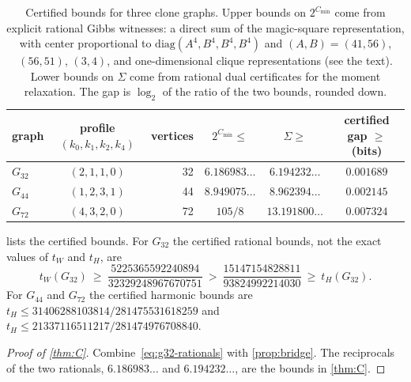 \documentclass[11pt]{article}
\theoremstyle{definition}
\newcommand{\Cmin}{C_{\min}}
\begin{document}
\begin{table}[t]
\centering
\begin{tabular}{@{}lcrccc@{}}
\toprule
graph & profile $(k_0,k_1,k_2,k_4)$ & vertices & $2^{\Cmin}\le$ & $\Sigma\ge$ & certified gap $\ge$ (bits)\\
\midrule
$G_{32}$ & $(2,1,1,0)$ & 32 & $6.186983\ldots$ & $6.194232\ldots$ & $0.001689$\\
$G_{44}$ & $(1,2,3,1)$ & 44 & $8.949075\ldots$ & $8.962394\ldots$ & $0.002145$\\
$G_{72}$ & $(4,3,2,0)$ & 72 & $105/8$          & $13.191800\ldots$ & $0.007324$\\
\bottomrule
\end{tabular}
\caption{Certified bounds for three clone graphs.  Upper bounds on
$2^{\Cmin}$ come from explicit rational Gibbs witnesses: a direct sum of the
magic-square representation, with center proportional to
$\mathrm{diag}(A^4,B^4,B^4,B^4)$ and $(A,B)=(41,56)$, $(56,51)$, $(3,4)$, and
one-dimensional clique representations (see the text).
Lower bounds on $\Sigma$ come from rational dual certificates for the moment
relaxation.  The gap is $\log_2$ of the ratio of the two bounds, rounded
down.}
\label{tab:certified}
\end{table}

 lists the certified bounds.  For $G_{32}$ the certified
rational bounds, not the exact values of $t_W$ and $t_H$, are
\begin{equation}\label{eq:g32-rationals}
 t_W(G_{32})\ \ge\ \frac{5225365592240894}{32329248967670751}
 \ >\ \frac{15147154828811}{93824992214030}\ \ge\ t_H(G_{32}).
\end{equation}
For $G_{44}$ and $G_{72}$ the certified harmonic bounds are
$t_H\le31406288103814/281475531618259$ and
$t_H\le21337116511217/281474976708840$.

\begin{proof}[Proof of \cref{thm:C}]
Combine~\eqref{eq:g32-rationals} with \cref{prop:bridge}.  The reciprocals of
the two rationals, $6.186983\ldots$ and $6.194232\ldots$, are the bounds in
\cref{thm:C}.
\end{proof}
\end{document}
